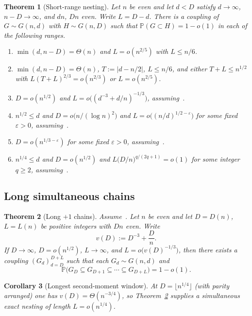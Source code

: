 \documentclass[11pt]{article}
\newtheorem{theorem}{Theorem}
\newtheorem{corollary}[theorem]{Corollary}
\newcommand{\PP}{\mathbb{P}}
\begin{document}
\begin{theorem}[Short-range nesting]
\label{thm:gim-gap}
Let \(n\) be even and let \(d<D\) satisfy \(d\to\infty\), \(n-D\to\infty\), and \(dn\), \(Dn\) even.
Write \(L=D-d\). There is a coupling of \(G\sim G(n,d)\) with \(H\sim G(n,D)\) such that
\(\PP(G\subset H)=1-o(1)\) in each of the following ranges.
\begin{enumerate}
\item \(\min(d,n-D)=\Theta(n)\) and \(L=o(n^{2/5})\) with \(L\le n/6\).
\item \(\min(d,n-D)=\Theta(n)\), \(T:=|d-n/2|\), \(L\le n/6\), and either \(T+L\le n^{1/2}\) with \(L(T+L)^{2/3}=o(n^{2/3})\) or \(L=o(n^{2/5})\).
\item \(D=o(n^{1/2})\) and \(L=o\bigl((d^{-3}+d/n)^{-1/3}\bigr)\), assuming~\cite[Theorem~6]{Gao20}.
\item \(n^{1/2}\le d\) and \(D=o\bigl(n/(\log n)^2\bigr)\) and \(L=o\bigl((n/d)^{1/2-\varepsilon}\bigr)\) for some fixed \(\varepsilon>0\), assuming~\cite[Theorem~6]{Gao20}.
\item \(D=o(n^{1/3-\varepsilon})\) for some fixed \(\varepsilon>0\), assuming~\cite[Theorem~6]{Gao20}.
\item \(n^{1/4}\le d\) and \(D=o(n^{1/2})\) and \(L\bigl(D/n\bigr)^{q/(2q+1)}=o(1)\) for some integer \(q\ge 2\), assuming~\cite[Theorem~6]{Gao20}.
\end{enumerate}
\end{theorem}

\subsection{Long simultaneous chains}

\begin{theorem}[Long \(+1\) chains]
\label{thm:chains}
Assume~\cite[Theorem~6]{Gao20}.
Let \(n\) be even and let \(D=D(n)\), \(L=L(n)\) be positive integers with \(Dn\) even.
Write
\[
v(D)
:=
D^{-3}+\frac{D}{n}.
\]
If \(D\to\infty\), \(D=o(n^{1/2})\), \(L\to\infty\), and \(L=o\bigl(v(D)^{-1/3}\bigr)\),
then there exists a coupling \((G_d)_{d=D}^{D+L}\) such that each \(G_d\sim G(n,d)\) and
\[
\PP\bigl(G_D\subseteq G_{D+1}\subseteq\cdots\subseteq G_{D+L}\bigr)=1-o(1).
\]
\end{theorem}

\begin{corollary}[Longest second-moment window]
\label{cor:mega}
At \(D=\lfloor n^{1/4}\rfloor\) (with parity arranged) one has
\(v(D)=\Theta(n^{-3/4})\), so Theorem~\ref{thm:chains} supplies a simultaneous
exact nesting of length \(L=o(n^{1/4})\).
\end{corollary}
\end{document}
